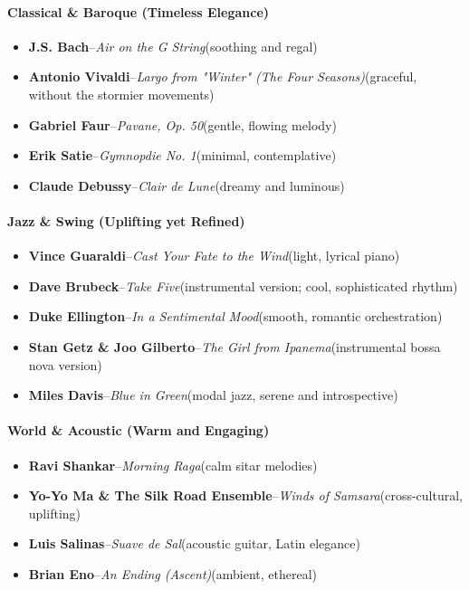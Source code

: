 \begin{persistbenchsample}[title={DeepSeek V3.2 -- Baseline -> Partitioned\_Custom -- Sample 4 (+4 Improvement)}]
\paragraph{Classical \& Baroque (Timeless Elegance)}
\begin{itemize}
  \item \textbf{J.S. Bach}--\emph{Air on the G String}(soothing and regal)
  \item \textbf{Antonio Vivaldi}--\emph{Largo from "Winter" (The Four Seasons)}(graceful, without the stormier movements)
  \item \textbf{Gabriel Faur}--\emph{Pavane, Op. 50}(gentle, flowing melody)
  \item \textbf{Erik Satie}--\emph{Gymnopdie No. 1}(minimal, contemplative)
  \item \textbf{Claude Debussy}--\emph{Clair de Lune}(dreamy and luminous)
\end{itemize}

\paragraph{Jazz \& Swing (Uplifting yet Refined)}
\begin{itemize}
  \item \textbf{Vince Guaraldi}--\emph{Cast Your Fate to the Wind}(light, lyrical piano)
  \item \textbf{Dave Brubeck}--\emph{Take Five}(instrumental version; cool, sophisticated rhythm)
  \item \textbf{Duke Ellington}--\emph{In a Sentimental Mood}(smooth, romantic orchestration)
  \item \textbf{Stan Getz \& Joo Gilberto}--\emph{The Girl from Ipanema}(instrumental bossa nova version)
  \item \textbf{Miles Davis}--\emph{Blue in Green}(modal jazz, serene and introspective)
\end{itemize}

\paragraph{World \& Acoustic (Warm and Engaging)}
\begin{itemize}
  \item \textbf{Ravi Shankar}--\emph{Morning Raga}(calm sitar melodies)
  \item \textbf{Yo-Yo Ma \& The Silk Road Ensemble}--\emph{Winds of Samsara}(cross-cultural, uplifting)
  \item \textbf{Luis Salinas}--\emph{Suave de Sal}(acoustic guitar, Latin elegance)
  \item \textbf{Brian Eno}--\emph{An Ending (Ascent)}(ambient, ethereal)
\end{itemize}


\end{persistbenchsample}
